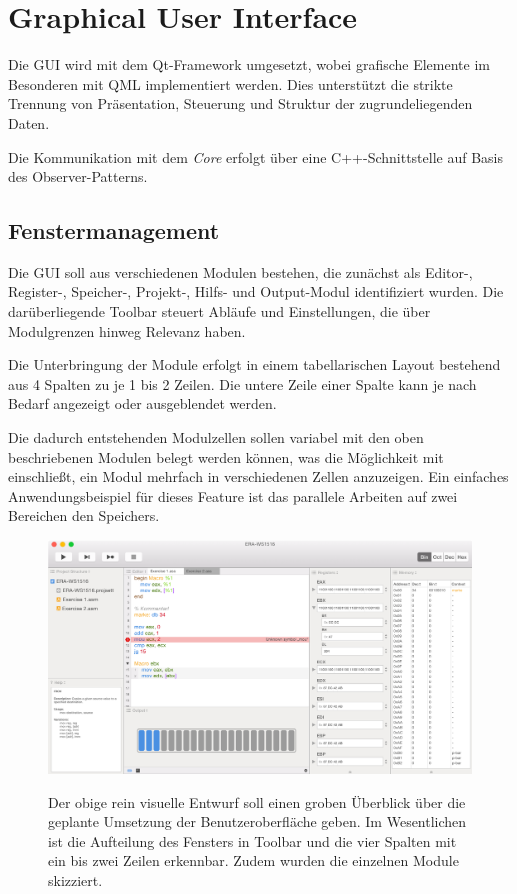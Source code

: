 \documentclass{article}
\begin{document}
    \section{Graphical User Interface}
        
        Die GUI wird mit dem Qt-Framework umgesetzt, wobei grafische Elemente im Besonderen mit QML implementiert werden. Dies unterstützt die strikte Trennung von Präsentation, Steuerung und Struktur der zugrundeliegenden Daten.
        
        Die Kommunikation mit dem \textit{Core} erfolgt über eine C++-Schnittstelle auf Basis des Observer-Patterns.
           

        \subsection{Fenstermanagement}
        
            Die GUI soll aus verschiedenen Modulen bestehen, die zunächst als Editor-, Register-, Speicher-, Projekt-, Hilfs- und Output-Modul identifiziert wurden. Die darüberliegende Toolbar steuert Abläufe und Einstellungen, die über Modulgrenzen hinweg Relevanz haben.
            
            Die Unterbringung der Module erfolgt in einem tabellarischen Layout bestehend aus 4 Spalten zu je 1 bis 2 Zeilen. Die untere Zeile einer Spalte kann je nach Bedarf angezeigt oder ausgeblendet werden.
            
            Die dadurch entstehenden Modulzellen sollen variabel mit den oben beschriebenen Modulen belegt werden können, was die Möglichkeit mit einschließt, ein Modul mehrfach in verschiedenen Zellen anzuzeigen. Ein einfaches Anwendungsbeispiel für dieses Feature ist das parallele Arbeiten auf zwei Bereichen den Speichers.
    
		    \begin{figure}
		    	\includegraphics[width=\textwidth]{Mockup}
		    	\label{fig:Mockup}
		    	\caption{Der obige rein visuelle Entwurf soll einen groben Überblick über die geplante Umsetzung der Benutzeroberfläche geben. Im Wesentlichen ist die Aufteilung des Fensters in Toolbar und die vier Spalten mit ein bis zwei Zeilen erkennbar. Zudem wurden die einzelnen Module skizziert.}
		    \end{figure}
    
\end{document}
